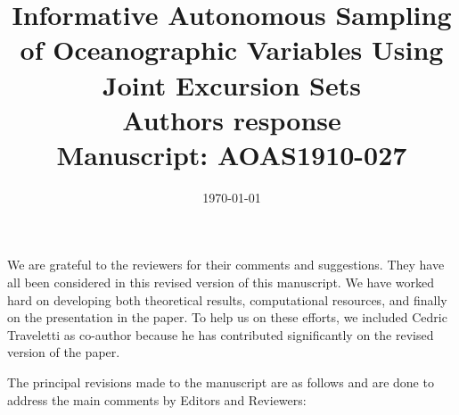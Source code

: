 \documentclass[a4paper]{article}
\newcounter{reviewer}
\begin{document}
\title{Informative Autonomous Sampling of Oceanographic Variables Using Joint Excursion Sets
  \\\vspace{5mm}
 Authors response
  \\\vspace{5mm}
\small{Manuscript: AOAS1910-027}}
\author{ }

\date{\today}

\maketitle

We are grateful to the reviewers for their comments and
suggestions. They have all been considered in this revised
version of this manuscript. We have worked hard on developing both theoretical results, computational resources, and finally on the presentation in the paper. To help us on these efforts, we included Cedric Traveletti as co-author because he has contributed significantly on the revised version of the paper. 

The principal revisions made to the manuscript are as follows and are done to address the main comments by Editors and Reviewers:
\end{document}
